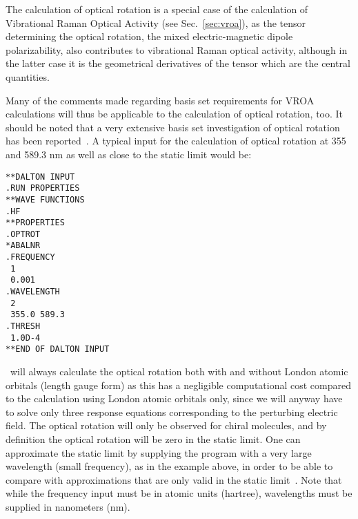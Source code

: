 \begin{center}
\end{center}

The calculation of optical rotation is a special case of the
calculation of Vibrational Raman Optical Activity (see
Sec.~\ref{sec:vroa}), as the tensor determining the optical rotation,
the mixed electric-magnetic dipole polarizability, also contributes to
vibrational Raman optical activity, although in the latter case it is the
geometrical derivatives of the tensor which are the central quantities.

Many of the comments made regarding basis set requirements for VROA
calculations will thus be applicable to the calculation of
optical rotation, too. It should be noted that a very extensive basis set
investigation of optical rotation has been
reported~\cite{jrcmjffjdpjsjpca104}.
A typical input for the calculation of optical rotation at
355 and 589.3 nm as well as close to the static limit would
be:

\begin{verbatim}
**DALTON INPUT
.RUN PROPERTIES
**WAVE FUNCTIONS
.HF
**PROPERTIES
.OPTROT
*ABALNR
.FREQUENCY
 1
 0.001
.WAVELENGTH
 2
 355.0 589.3
.THRESH
 1.0D-4
**END OF DALTON INPUT
\end{verbatim}

\dalton\ will always calculate the optical rotation both with and
without London atomic orbitals (length gauge form)
as this has a negligible computational
cost compared to the calculation using London atomic orbitals only,
since we will anyway have to solve only three response equations
corresponding to the perturbing electric field. The optical rotation
will only be observed for chiral molecules,
and by definition the optical
rotation will be zero in the static limit. One can approximate the
static limit by supplying the program with a very large wavelength
(small frequency), as in the example above, in order to be able to
compare with approximations that are only valid in the static
limit~\cite{rdacpl87,jrcmjffjdpjsjpca104}. Note that while the
frequency input must be in atomic units (hartree),
wavelengths must be supplied in nanometers (nm).


